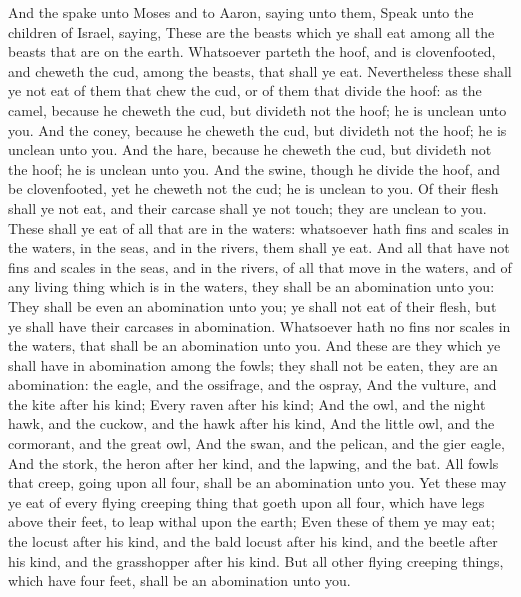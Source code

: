 \begin{biblechapter} %
 And the \LORD spake unto Moses and to Aaron, saying unto them,
\verse Speak unto the children of Israel, saying, These are the beasts which ye shall eat among all the beasts that are on the earth.
\verse Whatsoever parteth the hoof, and is clovenfooted, and cheweth the cud, among the beasts, that shall ye eat.
\verse Nevertheless these shall ye not eat of them that chew the cud, or of them that divide the hoof: as the camel, because he cheweth the cud, but divideth not the hoof; he is unclean unto you.
\verse And the coney, because he cheweth the cud, but divideth not the hoof; he is unclean unto you.
\verse And the hare, because he cheweth the cud, but divideth not the hoof; he is unclean unto you.
\verse And the swine, though he divide the hoof, and be clovenfooted, yet he cheweth not the cud; he is unclean to you.
\verse Of their flesh shall ye not eat, and their carcase shall ye not touch; they are unclean to you.
\verse These shall ye eat of all that are in the waters: whatsoever hath fins and scales in the waters, in the seas, and in the rivers, them shall ye eat.
\verse And all that have not fins and scales in the seas, and in the rivers, of all that move in the waters, and of any living thing which is in the waters, they shall be an abomination unto you:
\verse They shall be even an abomination unto you; ye shall not eat of their flesh, but ye shall have their carcases in abomination.
\verse Whatsoever hath no fins nor scales in the waters, that shall be an abomination unto you.
\verse And these are they which ye shall have in abomination among the fowls; they shall not be eaten, they are an abomination: the eagle, and the ossifrage, and the ospray,
\verse And the vulture, and the kite after his kind;
\verse Every raven after his kind;
\verse And the owl, and the night hawk, and the cuckow, and the hawk after his kind,
\verse And the little owl, and the cormorant, and the great owl,
\verse And the swan, and the pelican, and the gier eagle,
\verse And the stork, the heron after her kind, and the lapwing, and the bat.
\verse All fowls that creep, going upon all four, shall be an abomination unto you.
\verse Yet these may ye eat of every flying creeping thing that goeth upon all four, which have legs above their feet, to leap withal upon the earth;
\verse Even these of them ye may eat; the locust after his kind, and the bald locust after his kind, and the beetle after his kind, and the grasshopper after his kind.
\verse But all other flying creeping things, which have four feet, shall be an abomination unto you.

\end{biblechapter}
